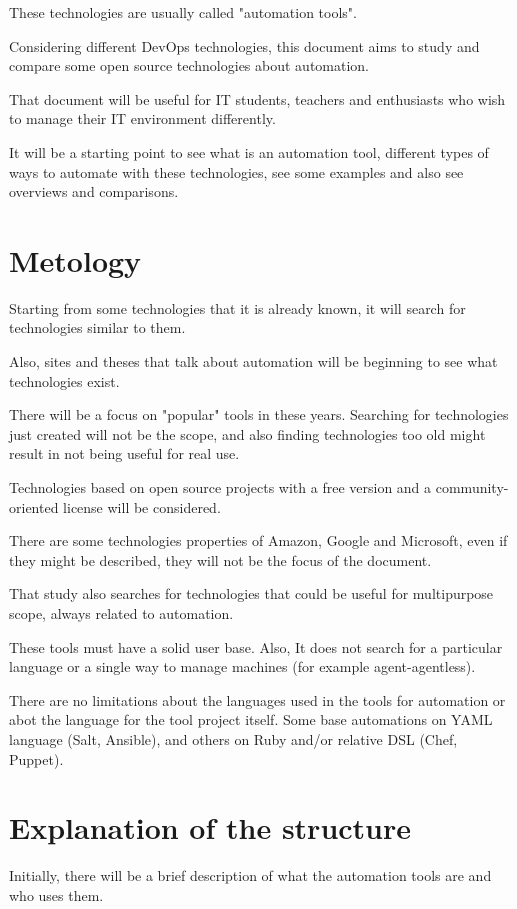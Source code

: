\documentclass[12pt,a4paper,openright,twoside]{book}
\begin{document}
These technologies are usually called "automation tools".

Considering different DevOps technologies, this document aims to study and compare some open source technologies about automation.

That document will be useful for IT students, teachers and enthusiasts who wish to manage their IT environment differently.

It will be a starting point to see what is an automation tool, different types of ways to automate with these technologies, see some examples and also see overviews and comparisons.

\section{Metology}
Starting from some technologies that it is already known, it will search for technologies similar to them.


Also, sites and theses that talk about automation will be beginning to see what technologies exist.


There will be a focus on "popular" tools in these years. Searching for technologies just created will not be the scope, and also finding technologies too old might result in not being useful for real use.


Technologies based on open source projects with a free version and a community-oriented license will be considered.


There are some technologies properties of Amazon, Google and Microsoft, even if they might be described, they will not be the focus of the document.


That study also searches for technologies that could be useful for multipurpose scope, always related to automation.


These tools must have a solid user base. Also, It does not search for a particular language or a single way to manage machines (for example agent-agentless).


There are no limitations about the languages used in the tools for automation or abot the language for the tool project itself. Some base automations on YAML language (Salt, Ansible), and others on Ruby and/or relative DSL (Chef, Puppet).

\section{Explanation of the structure}
Initially, there will be a brief description of what the automation tools are and who uses them.
\end{document}
